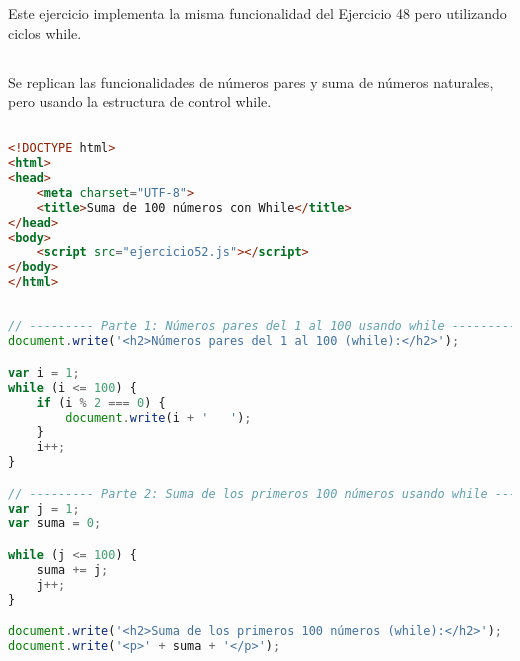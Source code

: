 \documentclass[10pt,a4paper]{article}
\begin{document}
\pagebreak

\section{\color{colorIPN}{Ejercicio 52: Ciclos While}}
Este ejercicio implementa la misma funcionalidad del Ejercicio 48 pero utilizando ciclos while.

\subsection{\color{colorESCOM}{Descripción del Problema}}
Se replican las funcionalidades de números pares y suma de números naturales, pero usando la estructura de control while.

\subsection{\color{colorESCOM}{Código HTML}}
\begin{lstlisting}[language=HTML]
<!DOCTYPE html>
<html>
<head>
    <meta charset="UTF-8"> 
    <title>Suma de 100 números con While</title>
</head>
<body>
    <script src="ejercicio52.js"></script>
</body>
</html>
\end{lstlisting}

\subsection{\color{colorESCOM}{Código JavaScript}}
\begin{lstlisting}[language=JavaScript]
// --------- Parte 1: Números pares del 1 al 100 usando while ---------
document.write('<h2>Números pares del 1 al 100 (while):</h2>');

var i = 1;
while (i <= 100) {
    if (i % 2 === 0) {
        document.write(i + '   ');
    }
    i++;
}

// --------- Parte 2: Suma de los primeros 100 números usando while ---------
var j = 1;
var suma = 0;

while (j <= 100) {
    suma += j;
    j++;
}

document.write('<h2>Suma de los primeros 100 números (while):</h2>');
document.write('<p>' + suma + '</p>');
\end{lstlisting}
\end{document}
